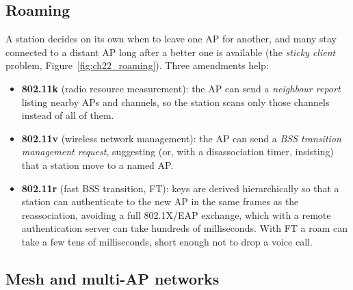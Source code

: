 
\subsection{Roaming}

A station decides on its own when to leave one AP for another, and many stay connected to a distant
AP long after a better one is available (the \emph{sticky client} problem, Figure~\ref{fig:ch22_roaming}).
Three amendments help:
\begin{itemize}
\item \textbf{802.11k} (radio resource measurement): the AP can send a \emph{neighbour report} listing
nearby APs and channels, so the station scans only those channels instead of all of them.
\item \textbf{802.11v} (wireless network management): the AP can send a \emph{BSS transition
management request}, suggesting (or, with a disassociation timer, insisting) that a station move to
a named AP.
\item \textbf{802.11r} (fast BSS transition, FT): keys are derived hierarchically so that a station
can authenticate to the new AP in the same frames as the reassociation, avoiding a full 802.1X/EAP
exchange, which with a remote authentication server can take hundreds of milliseconds. With FT a
roam can take a few tens of milliseconds, short enough not to drop a voice call.
\end{itemize}


\subsection{Mesh and multi-AP networks}

